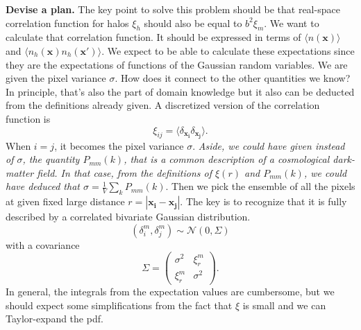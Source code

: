 \textbf{Devise a plan.} The key point to solve this problem should be that real-space correlation function for halos $\xi_h$ should also be equal to $b^2\xi_m$. We want to calculate that correlation function. It should be expressed in terms of $\langle n(\mathbf{x})\rangle$ and $\langle n_h(\mathbf{x})n_h(\mathbf{x'})\rangle$. We expect to be able to calculate these expectations since they are the expectations of functions of the Gaussian random variables. We are given the pixel variance $\sigma$. How does it connect to the other quantities we know? In principle, that's also the part of domain knowledge but it also can be deducted from the definitions already given. A discretized version of the correlation function is \begin{equation}    \xi_{ij} = \langle\delta_{\mathbf{x_i}}\delta_{\mathbf{x_j}}\rangle.\end{equation}
When $i=j$, it becomes the pixel variance $\sigma$. \textit{Aside, we could have given instead of $\sigma$, the quantity $P_{mm}(k)$, that is a common description of a cosmological dark-matter field. In that case, from the definitions of $\xi(r)$ and $P_{mm}(k)$, we could have deduced that $\sigma = \frac{1}{V}\sum_{k}P_{mm}(k)$}. Then we pick the ensemble of all the pixels at given fixed large distance $r=|\mathbf{x_i}-\mathbf{x_j}|$. The key is to recognize that it is fully described by a correlated bivariate Gaussian distribution. \begin{equation}    (\delta^m_{i},\delta^m_{j}) \sim \mathcal{N}(0,\Sigma) \end{equation}with a covariance\begin{equation}    \Sigma = \begin{pmatrix}        \sigma^2 & \xi^m_r  \\      \xi^m_r & \sigma^2    \end{pmatrix}.\end{equation}In general, the integrals from the expectation values are cumbersome, but we should expect some simplifications from the fact that $\xi$ is small and we can Taylor-expand the pdf. \\


